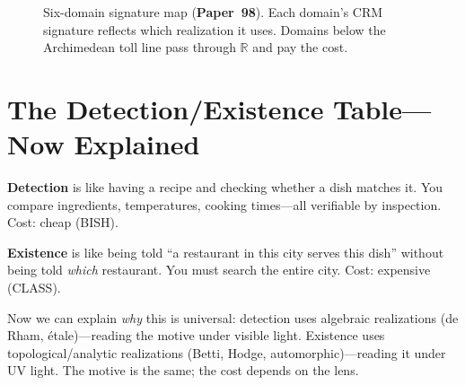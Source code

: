 \documentclass[11pt,twoside,openany]{report}
\theoremstyle{remark}
\newcommand{\BISH}{\textsf{BISH}}
\newcommand{\LPO}{\textsf{LPO}}
\newcommand{\CLASS}{\textsf{CLASS}}
\newcommand{\MP}{\textsf{MP}}
\newcommand{\paperref}[1]{\textbf{Paper~#1}}
\begin{document}
\begin{figure}[htbp]
\centering
{}
\caption{Six-domain signature map (\paperref{98}). Each domain's CRM signature reflects which realization it uses. Domains below the Archimedean toll line pass through $\mathbb{R}$ and pay the cost.}
\label{fig:six-domain}
\end{figure}


\section{The Detection/Existence Table---Now Explained}

\begin{analogybox}
\textbf{Detection} is like having a recipe and checking whether a dish matches it. You compare ingredients, temperatures, cooking times---all verifiable by inspection. Cost: cheap (\BISH).

\textbf{Existence} is like being told ``a restaurant in this city serves this dish'' without being told \emph{which} restaurant. You must search the entire city. Cost: expensive (\CLASS).

Now we can explain \emph{why} this is universal: detection uses algebraic realizations (de Rham, \'etale)---reading the motive under visible light. Existence uses topological/analytic realizations (Betti, Hodge, automorphic)---reading it under UV light. The motive is the same; the cost depends on the lens.
\end{analogybox}
\end{document}
